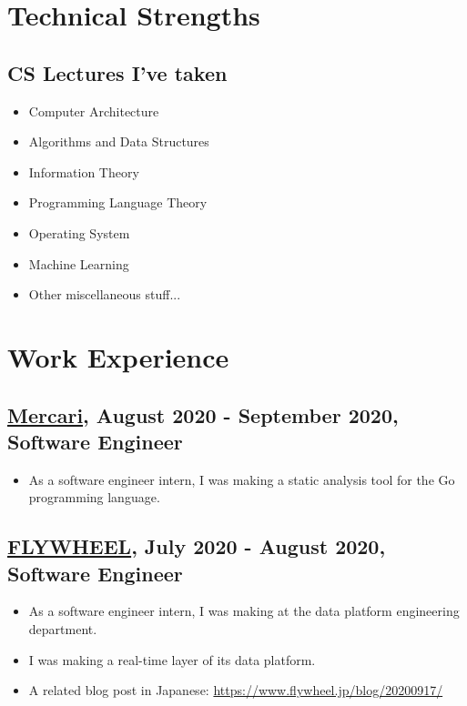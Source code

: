 \documentclass{article}
\begin{document}
\section*{Technical Strengths}
  \subsection*{CS Lectures I've taken}
    \begin{itemize}
      \item Computer Architecture
      \item Algorithms and Data Structures
      \item Information Theory
      \item Programming Language Theory
      \item Operating System
      \item Machine Learning
      \item Other miscellaneous stuff...
    \end{itemize}

\section*{Work Experience}
  \subsection*{\href{https://about.mercari.com/en/}{Mercari}, August 2020 - September 2020, Software Engineer}
    \begin{itemize}
      \item As a software engineer intern, I was making a static analysis tool for the Go programming language.
    \end{itemize}

  \subsection*{\href{https://www.flywheel.jp/}{FLYWHEEL}, July 2020 - August 2020, Software Engineer}
    \begin{itemize}
      \item As a software engineer intern, I was making at the data platform engineering department.
      \item I was making a real-time layer of its data platform.
      \item A related blog post in Japanese: \url{https://www.flywheel.jp/blog/20200917/}
    \end{itemize}
\end{document}
